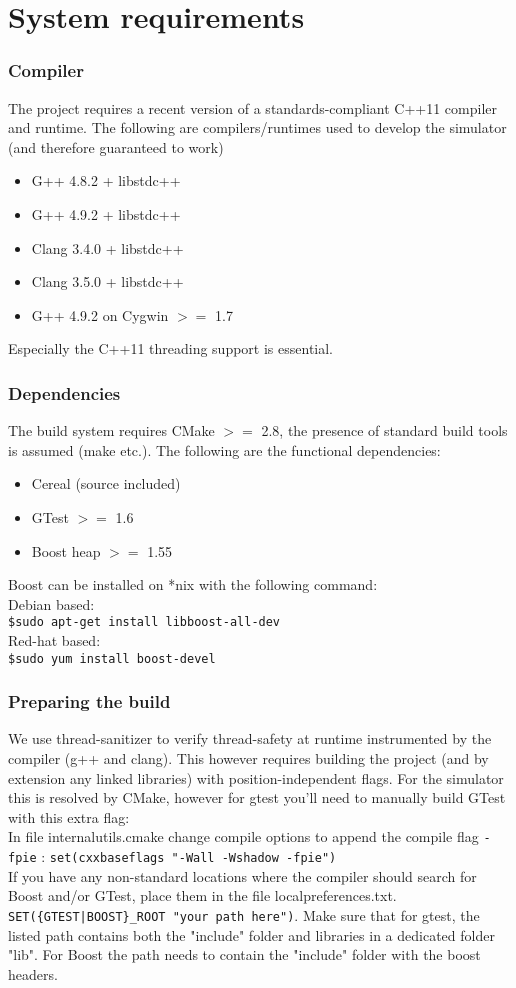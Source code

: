 \section{System requirements}
\subsubsection{Compiler}
The project requires a recent version of a standards-compliant C++11 compiler and runtime. The following are compilers/runtimes used to develop the simulator (and therefore guaranteed to work)
\begin{itemize}
  \item G++ 4.8.2 + libstdc++
  \item G++ 4.9.2 + libstdc++
  \item Clang 3.4.0 + libstdc++
  \item Clang 3.5.0 + libstdc++
  \item G++ 4.9.2 on Cygwin $>=$ 1.7
\end{itemize}
Especially the C++11 threading support is essential.
\subsubsection{Dependencies}
The build system requires CMake $>=$ 2.8, the presence of standard build tools is assumed (make etc.).
The following are the functional dependencies:
\begin{itemize}
  \item Cereal (source included)
  \item GTest $>=$ 1.6
  \item Boost heap $>=$ 1.55  
\end{itemize}
Boost can be installed on *nix with the following command:\\
Debian based:\\
\texttt{\$sudo apt-get install libboost-all-dev}\\
Red-hat based:\\
\texttt{\$sudo yum install boost-devel}\\
\subsubsection{Preparing the build}
We use thread-sanitizer to verify thread-safety at runtime instrumented by the compiler (g++ and clang). This however requires building the project (and by extension any linked libraries) with position-independent flags. For the simulator this is resolved by CMake, however for gtest you'll need to manually build GTest with this extra flag:\\
In file internal\textunderscore utils.cmake change compile options to append the compile flag \texttt{-fpie} :
\texttt{set(cxx\textunderscore base\textunderscore flags "-Wall -Wshadow -fpie")}\\
If you have any non-standard locations where the compiler should search for Boost and/or GTest, place them in the file localpreferences.txt.\\
\texttt{SET(\{GTEST|BOOST\}\_ROOT "your path here")}. Make sure that for gtest, the listed path contains both the "include" folder and libraries in a dedicated folder "lib". For Boost the path needs to contain the "include" folder with the boost headers.
